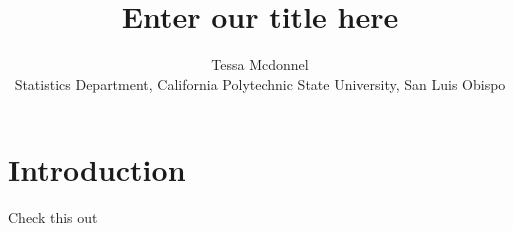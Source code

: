 \documentclass[]{tise_style}
\title{Enter our title here}
\author{Tessa Mcdonnel \\Statistics Department, California Polytechnic State University, San Luis Obispo}
\begin{document}
\section{Introduction}

Check this out
\end{document}
